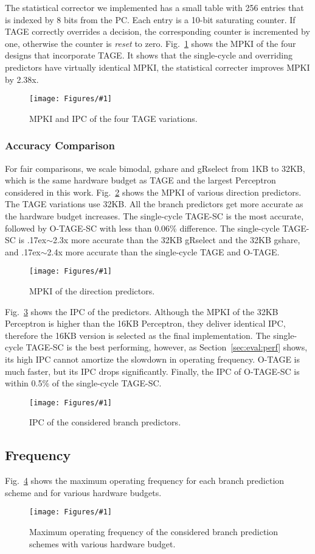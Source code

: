 \documentclass[conference]{IEEEtran}
\newcommand{\mytilde}{{\raise.17ex\hbox{$\scriptstyle\sim$}}}
\newcommand{\kfig}[4]{ %
        \begin{figure}[!t]
        \centering
        \texttt{[image: Figures/\#1]}
        \vspace{-1mm}
        \caption{#3}
        \label{#2}
        \end{figure}
}
\begin{document}
The statistical corrector we implemented has a small table with 256 entries that is indexed by 8 bits from the PC. Each entry is a 10-bit saturating counter. If TAGE correctly overrides a decision, the corresponding counter is incremented by one, otherwise the counter is \textit{reset} to zero. Fig.~\ref{fig:tageMPKI} shows the MPKI of the four designs that incorporate TAGE. It shows that the single-cycle and overriding predictors have virtually identical MPKI, the statistical correcter improves MPKI by 2.38x.
\kfig{tageMPKI.pdf}{fig:tageMPKI}{MPKI and IPC of the four TAGE variations.}{angle = 0, trim = 0.7in 2.3in 1in 2.7in, clip, width=0.35\textwidth}


\subsubsection{Accuracy Comparison}
\label{sec:eval:ipc:comparison}
For fair comparisons, we scale bimodal, gshare and gRselect from 1KB to 32KB, which is the same hardware budget as TAGE and the largest Perceptron considered in this work. Fig.~\ref{fig:admpki} shows the MPKI of various direction predictors. The TAGE variations use 32KB. All the branch predictors get more accurate as the hardware budget increases. The single-cycle \mbox{TAGE-SC} is the most accurate, followed by \mbox{O-TAGE-SC} with less than 0.06\% difference. The single-cycle \mbox{TAGE-SC} is \mytilde 2.3x more accurate than the 32KB gRselect and the 32KB gshare, and \mytilde 2.4x more accurate than the single-cycle TAGE and \mbox{O-TAGE}.
\kfig{admpki.pdf}{fig:admpki}{MPKI of the direction predictors.}{angle = 0, trim = 0.9in 2.7in 0.8in 2.7in, clip, width=0.5\textwidth}

Fig.~\ref{fig:adipc} shows the IPC of the predictors. Although the MPKI of the 32KB Perceptron is higher than the 16KB Perceptron, they deliver identical IPC, therefore the 16KB version is selected as the final implementation. The single-cycle \mbox{TAGE-SC} is the best performing, however, as Section~\ref{sec:eval:perf} shows, its high IPC cannot amortize the slowdown in operating frequency. \mbox{O-TAGE} is much faster, but its IPC drops significantly. Finally, the IPC of \mbox{O-TAGE-SC} is within 0.5\% of the single-cycle \mbox{TAGE-SC}.
\kfig{adipc.pdf}{fig:adipc}{IPC of the considered branch predictors.}{angle = 0, trim = 0.9in 2.9in 0.8in 2.9in, clip, width=0.5\textwidth}

\subsection{Frequency}
\label{sec:eval:fmax}
Fig.~\ref{fig:adfmax} shows the maximum operating frequency for each branch prediction scheme and for various hardware budgets.
\kfig{adfmax.pdf}{fig:adfmax}{Maximum operating frequency of the considered branch prediction schemes with various hardware budget.}{angle = 0, trim = 0.8in 4.6in 0.7in 5.2in, clip, width=0.5\textwidth}
\end{document}
